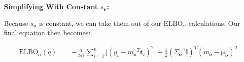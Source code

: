 \documentclass[letterpaper,12pt]{article}
\newcommand{\sigmaepsilon}{\sigma_\epsilon^2} %
\newcommand{\nuv}{\boldsymbol{\nu}} %
\newcommand{\ti}{\boldsymbol{t}_i} %
\newcommand{\Sigmanu}{\Sigma_{\nuv}} %
\newcommand{\mnu}{\ensuremath{m_\nuv}} %
\newcommand{\elbo}{\ensuremath{\mathrm{ELBO}}}
\begin{document}
\noindent \textbf{Simplifying With Constant $s_\nuv$:}

Because $s_\nuv$ is constant, we can take them out of our $\elbo_\alpha$ calculations. Our final equation then becomes: 

\begin{equation}
\begin{split}
    \elbo_\alpha(q) &= -\frac{\alpha}{2 \sigmaepsilon} \sum_{i=1}^n \Bigg[(y_i - {\mnu}^T \ti)^2 \Bigg] - \frac{1}{2} (\Sigmanu^{-1} \mathbb{I} )^T (m_{\nuv}  - \boldsymbol{\mu}_{\nuv} )^2 \\
\end{split}
\end{equation}

\printbibliography
\end{document}
